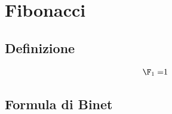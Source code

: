 \chapter{Fibonacci}
\section{Definizione}
\begin{defn}
	\begin{align*}
		\Fib{1}=&1\\
	\end{align*}
\end{defn}
\section{Formula di Binet}